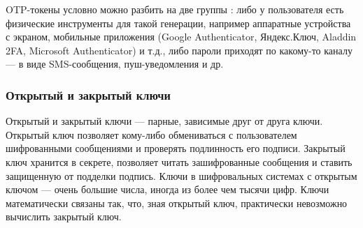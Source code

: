 OTP-токены условно можно разбить на две группы \cite{bib10}: либо у пользователя есть физические инструменты для такой генерации, например аппаратные устройства с экраном, мобильные приложения (Google Authenticator, \linebreak Яндекс.Ключ, Aladdin 2FA, Microsoft Authenticator) и т.д., либо пароли приходят по какому-то каналу --- в виде SMS-сообщения, пуш-уведомления и др. 

\subsubsection{Открытый и закрытый ключи}
Открытый и закрытый ключи \cite{bib6} --- парные, зависимые друг от друга ключи. Открытый ключ позволяет кому-либо обмениваться с пользователем шифрованными сообщениями и проверять подлинность его подписи. Закрытый ключ хранится в секрете, позволяет читать зашифрованные сообщения и ставить защищенную от подделки подпись. Ключи в шифровальных системах с открытым ключом --- очень большие числа, иногда из более чем тысячи цифр. Ключи математически связаны так, что, зная открытый ключ, практически невозможно вычислить закрытый ключ.